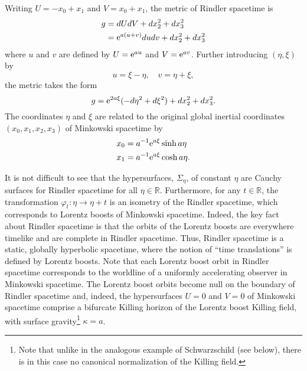 \documentclass[12pt]{article}
\newcommand{\RR}{\mathbb{R}}
\newcommand{\e}{{\rm e}}
\theoremstyle{plain}
\theoremstyle{definition}
\def\ben{\begin{equation}}
\def\een{\end{equation}}
\begin{document}
Writing $U = -x_0 + x_1$ and $V = x_0 + x_1$, the metric of Rindler spacetime is
\ben
\begin{split}
g &= dU dV + dx^2_2 + dx^2_3  \\
&= \e^{a(u+v)} du dv + dx^2_2 + dx^2_3
\end{split}
\een
where $u$ and $v$ are defined by $U=\e^{au}$ and $V=\e^{av}$. Further introducing $(\eta, \xi)$ by
\ben
u = \xi - \eta, \quad v = \eta + \xi,
\een
the metric takes the form
\ben
g = \e^{2a\xi}(- d\eta^2 + d\xi^2) + dx^2_2 + dx^2_3 .
\een
The coordinates $\eta$ and $\xi$ are related to
the original global inertial coordinates $(x_0, x_1, x_2, x_3)$ of Minkowski spacetime by
\ben
\label{boosts}
\begin{split}
x_0 &= a^{-1} \e^{a\xi} \sinh a\eta\\
x_1 &= a^{-1} \e^{a\xi} \cosh a\eta.
\end{split}
\een

It is not difficult to see that the hypersurfaces, $\Sigma_\eta$, of constant $\eta$ are Cauchy surfaces for Rindler spacetime for all $\eta \in \RR$. Furthermore, for any $t \in \RR$, the transformation $\varphi_t: \eta \to \eta +
t$ is an isometry of the Rindler spacetime, which corresponds to Lorentz boosts of Minkowski spacetime. Indeed,
the key fact about Rindler spacetime is that the orbits of the Lorentz boosts are everywhere timelike and are complete in Rindler spacetime. Thus, Rindler spacetime is a static, globally hyperbolic spacetime, where the notion of ``time translations'' is defined by Lorentz boosts. Note that each Lorentz boost orbit in Rindler spacetime corresponds to the worldline of a uniformly accelerating observer in
Minkowski spacetime. The Lorentz boost orbits become null on the boundary of Rindler spacetime and, indeed, the hypersurfaces $U=0$ and $V=0$ of Minkowski spacetime comprise a bifurcate Killing horizon of the Lorentz boost Killing field, with surface gravity\footnote{Note that unlike in the analogous example of Schwarzschild (see below), there is in this case 
no canonical normalization of the Killing field.} $\kappa = a$.
\end{document}
